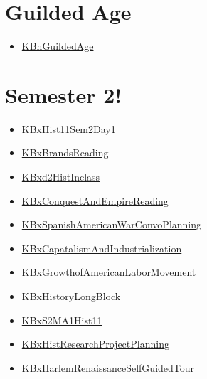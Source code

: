 \documentclass[letterpaper]{article}
\begin{document}
\section{Guilded Age}
\label{sec:orgff7dd88}
\begin{itemize}
\item \href{KBhGuildedAge.org}{KBhGuildedAge}
\end{itemize}

\section{Semester 2!}
\label{sec:orgd29a2b9}
\begin{itemize}
\item \href{KBxHist11Sem2Day1.org}{KBxHist11Sem2Day1}
\item \href{KBxBrandsReading.org}{KBxBrandsReading}
\item \href{KBxd2HistInclass.org}{KBxd2HistInclass}
\item \href{KBxConquestAndEmpireReading.org}{KBxConquestAndEmpireReading}
\item \href{KBxSpanishAmericanWarConvoPlanning.org}{KBxSpanishAmericanWarConvoPlanning}
\item \href{KBxCapatalismAndIndustrialization.org}{KBxCapatalismAndIndustrialization}
\item \href{KBxGrowthofAmericanLaborMovement.org}{KBxGrowthofAmericanLaborMovement}
\item \href{KBxHistoryLongBlock.org}{KBxHistoryLongBlock}
\item \href{KBxS2MA1Hist11.org}{KBxS2MA1Hist11}
\item \href{KBxHistResearchProjectPlanning.org}{KBxHistResearchProjectPlanning}
\item \href{KBxHarlemRenaissanceSelfGuidedTour.org}{KBxHarlemRenaissanceSelfGuidedTour}
\end{itemize}
\end{document}
